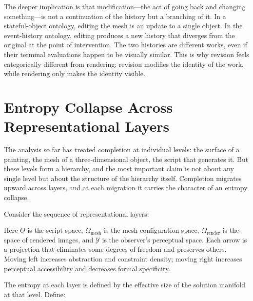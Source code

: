 \documentclass[11pt, twoside]{article}
\theoremstyle{plain}
\theoremstyle{definition}
\theoremstyle{remark}
\begin{document}
The deeper implication is that modification---the act of going back and changing something---is not a continuation of the history but a branching of it. In a stateful-object ontology, editing the mesh is an update to a single object. In the event-history ontology, editing produces a new history that diverges from the original at the point of intervention. The two histories are different works, even if their terminal evaluations happen to be visually similar. This is why revision feels categorically different from rendering: revision modifies the identity of the work, while rendering only makes the identity visible.

\section{Entropy Collapse Across Representational Layers}
\label{sec:entropy-collapse}

The analysis so far has treated completion at individual levels: the surface of a painting, the mesh of a three-dimensional object, the script that generates it. But these levels form a hierarchy, and the most important claim is not about any single level but about the structure of the hierarchy itself. Completion migrates upward across layers, and at each migration it carries the character of an entropy collapse.

Consider the sequence of representational layers:

\medskip
\begin{center}
\end{center}
\medskip

Here $\Theta$ is the script space, $\Omega_{\text{mesh}}$ is the mesh configuration space, $\Omega_{\text{render}}$ is the space of rendered images, and $\mathcal{Y}$ is the observer's perceptual space. Each arrow is a projection that eliminates some degrees of freedom and preserves others. Moving left increases abstraction and constraint density; moving right increases perceptual accessibility and decreases formal specificity.

The entropy at each layer is defined by the effective size of the solution manifold at that level. Define:
\end{document}
